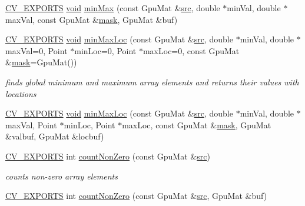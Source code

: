 \begin{DoxyCompactItemize}
\hyperlink{core_2types__c_8h_a1bf9f0e121b54272da02379cfccd0a2b}{C\-V\-\_\-\-E\-X\-P\-O\-R\-T\-S} \hyperlink{legacy_8hpp_a8bb47f092d473522721002c86c13b94e}{void} \hyperlink{namespacecv_1_1gpu_a55a5a8723234d84d92047f4e59100507}{min\-Max} (const Gpu\-Mat \&\hyperlink{legacy_8hpp_a371cd109b74033bc4366f584edd3dacc}{src}, double $\ast$min\-Val, double $\ast$max\-Val, const Gpu\-Mat \&\hyperlink{tracking_8hpp_a6b13ecd2fd6ec7ad422f1d7863c3ad19}{mask}, Gpu\-Mat \&buf)
\item 
\hyperlink{core_2types__c_8h_a1bf9f0e121b54272da02379cfccd0a2b}{C\-V\-\_\-\-E\-X\-P\-O\-R\-T\-S} \hyperlink{legacy_8hpp_a8bb47f092d473522721002c86c13b94e}{void} \hyperlink{namespacecv_1_1gpu_a39ee438c6cd5a4841439188fe0fac448}{min\-Max\-Loc} (const Gpu\-Mat \&\hyperlink{legacy_8hpp_a371cd109b74033bc4366f584edd3dacc}{src}, double $\ast$min\-Val, double $\ast$max\-Val=0, Point $\ast$min\-Loc=0, Point $\ast$max\-Loc=0, const Gpu\-Mat \&\hyperlink{tracking_8hpp_a6b13ecd2fd6ec7ad422f1d7863c3ad19}{mask}=Gpu\-Mat())
\begin{DoxyCompactList}\small\item\em finds global minimum and maximum array elements and returns their values with locations \end{DoxyCompactList}\item 
\hyperlink{core_2types__c_8h_a1bf9f0e121b54272da02379cfccd0a2b}{C\-V\-\_\-\-E\-X\-P\-O\-R\-T\-S} \hyperlink{legacy_8hpp_a8bb47f092d473522721002c86c13b94e}{void} \hyperlink{namespacecv_1_1gpu_a8e7cae03cbe13c8419fb95309da0c8d0}{min\-Max\-Loc} (const Gpu\-Mat \&\hyperlink{legacy_8hpp_a371cd109b74033bc4366f584edd3dacc}{src}, double $\ast$min\-Val, double $\ast$max\-Val, Point $\ast$min\-Loc, Point $\ast$max\-Loc, const Gpu\-Mat \&\hyperlink{tracking_8hpp_a6b13ecd2fd6ec7ad422f1d7863c3ad19}{mask}, Gpu\-Mat \&valbuf, Gpu\-Mat \&locbuf)
\item 
\hyperlink{core_2types__c_8h_a1bf9f0e121b54272da02379cfccd0a2b}{C\-V\-\_\-\-E\-X\-P\-O\-R\-T\-S} int \hyperlink{namespacecv_1_1gpu_aec527594d46c5b49dbe82fd9c1ed72da}{count\-Non\-Zero} (const Gpu\-Mat \&\hyperlink{legacy_8hpp_a371cd109b74033bc4366f584edd3dacc}{src})
\begin{DoxyCompactList}\small\item\em counts non-\/zero array elements \end{DoxyCompactList}\item 
\hyperlink{core_2types__c_8h_a1bf9f0e121b54272da02379cfccd0a2b}{C\-V\-\_\-\-E\-X\-P\-O\-R\-T\-S} int \hyperlink{namespacecv_1_1gpu_aeef3b5c39f3559f0b9147fd6b2efae57}{count\-Non\-Zero} (const Gpu\-Mat \&\hyperlink{legacy_8hpp_a371cd109b74033bc4366f584edd3dacc}{src}, Gpu\-Mat \&buf)

\end{DoxyCompactItemize}
